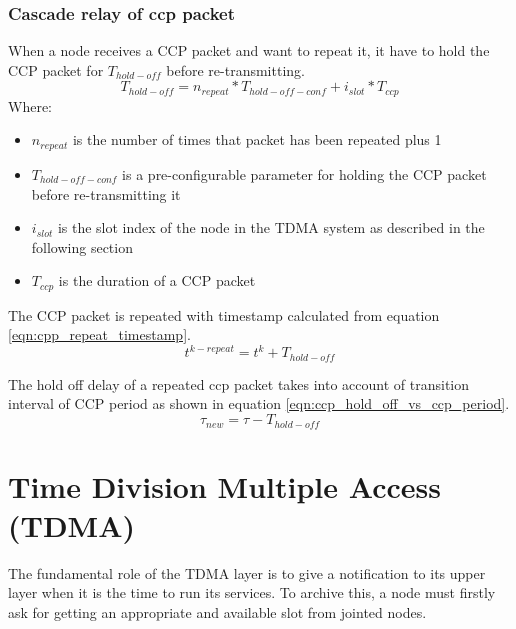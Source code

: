 \documentclass[\main/main.tex]{subfiles}
\begin{document}
\subsubsection{Cascade relay of ccp packet}
When a node receives a CCP packet and want to repeat it, it have to hold the CCP packet for $T_{hold-off}$ before re-transmitting.
\begin{equation}
    T_{hold-off} = n_{repeat}*T_{hold-off-conf} + i_{slot}*T_{ccp}
\end{equation}
Where:
\begin{itemize}
    \item $n_{repeat}$ is the number of times that packet has been repeated plus 1
    \item $T_{hold-off-conf}$ is a pre-configurable parameter for holding the CCP packet before re-transmitting it
    \item $i_{slot}$ is the slot index of the node in the TDMA system as described in the following section
    \item  $T_{ccp}$ is the duration of a CCP packet
\end{itemize}

The CCP packet is repeated with timestamp calculated from equation \ref{eqn:cpp_repeat_timestamp}.
\begin{equation}
    t^{k-repeat} = t^k + T_{hold-off}
    \label{eqn:cpp_repeat_timestamp}
\end{equation}

The hold off delay of a repeated ccp packet takes into account of transition interval of CCP period as shown in equation \ref{eqn:ccp_hold_off_vs_ccp_period}.
\begin{equation}
    \tau_{new} = \tau - T_{hold-off}
    \label{eqn:ccp_hold_off_vs_ccp_period}
\end{equation}

\section{Time Division Multiple Access (TDMA)}
The fundamental role of the TDMA layer is to give a notification to its upper layer when it is the time to run its services. To archive this, a node must firstly ask for getting an appropriate and available slot from jointed nodes.
\end{document}

